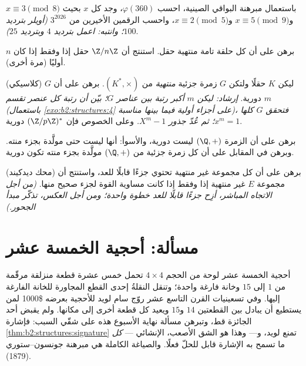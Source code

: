 \begin{exercise}[$\star\star$]\label{exo:b2:structures:8}
باستعمال مبرهنة البواقي الصينية، احسب $\varphi(360)$، وجد
كل $x$ بحيث $x \equiv 3 \pmod 8$ و$x \equiv 5 \pmod 9$ و$x
\equiv 2 \pmod 5$، واحسب الرقمين الأخيرين من $3^{2026}$
\emph{(أويلر بترديد $100$؛ وانتبه: اعمل بترديد $4$ وبترديد $25$)}.
\end{exercise}

\begin{exercise}[$\star\star\star$]\label{exo:b2:structures:9}
برهن على أن كل حلقة تامة منتهية حقل. استنتج أن
$\Z/n\Z$ حقل إذا وفقط إذا كان $n$ أوليًا (مرة أخرى).
\end{exercise}

\begin{exercise}[$\star\star\star$]\label{exo:b2:structures:10}
(كلاسيكي) ليكن $K$ حقلًا ولتكن $G$ زمرة جزئية \emph{منتهية} من
$(K^*, \times)$. برهن على أن $G$ دورية.
\emph{إرشاد: ليكن $m$ أكبر رتبة بين عناصر $G$؛
بيّن أن رتبة كل عنصر تقسم $m$ (باستعمال
\cref{exo:b2:structures:4} على أجزاء أولية فيما بينها مناسبة)، فتحقق $G$ كلها
$x^m = 1$؛ ثم عُدّ جذور $X^m - 1$.}
وعلى الخصوص فإن $(\Z/p\Z)^*$ دورية.
\end{exercise}

\begin{exercise}[$\star\star\star$]\label{exo:b2:structures:11}
برهن على أن الزمرة $(\Q, +)$ ليست دورية، والأسوأ: أنها ليست
حتى مولَّدة بجزء منته. وبرهن في المقابل على أن كل زمرة جزئية من
$(\Q, +)$ مولَّدة بجزء منته تكون دورية.
\end{exercise}

\begin{exercise}[$\star\star$]\label{exo:b2:structures:12}
(محك ديدكيند) برهن على أن كل مجموعة غير منتهية تحتوي جزءًا
قابلًا للعد، واستنتج أن مجموعة $E$ غير منتهية إذا وفقط
إذا كانت مساوية القوة لجزء صحيح منها. \emph{(من أجل الاتجاه
المباشر، أزِح جزءًا قابلًا للعد خطوة واحدة؛ ومن أجل العكس،
تذكّر مبدأ الجحور.)}
\end{exercise}

\section{مسألة: أحجية الخمسة عشر}

أحجية الخمسة عشر لوحة من الحجم $4 \times 4$ تحمل خمس عشرة قطعة منزلقة
مرقّمة من $1$ إلى $15$ وخانة فارغة واحدة؛ وتنقل النقلةُ إحدى
القطع المجاورة للخانة الفارغة إليها. وفي تسعينيات القرن التاسع عشر
روّج سام لويد للأحجية بعرضه \$1000 لمن يستطيع أن
يبادل بين القطعتين $14$ و$15$ ويعيد كل قطعة أخرى إلى
مكانها. ولم يقبض أحد الجائزة قط، وتبرهن مسألة نهاية الأسبوع هذه على
شقّي السبب: فإشارة
\cref{thm:b2:structures:signature} تمنع  لويد،
و--- وهذا هو الشق الأصعب، الإنشائي --- \emph{كل} ما تسمح به الإشارة
قابل للحلّ فعلًا. والصياغة الكاملة هي مبرهنة جونسون--ستوري (1879).

